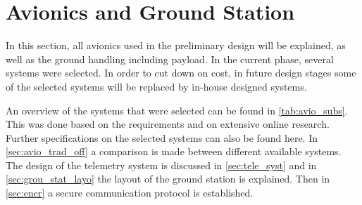 \section{Avionics and Ground Station}%
\label{sec:avio_grou_stat}
In this section, all avionics used in the preliminary design will be explained, as well as the ground handling including payload. In the current phase, several systems were selected. In order to cut down on cost, in future design stages some of the selected systems will be replaced by in-house designed systems. 

An overview of the systems that were selected can be found in \autoref{tab:avio_subs}. This was done based on the requirements %
and on extensive online research. Further specifications on the selected systems can also be found here. In \autoref{sec:avio_trad_off} a comparison is made between different available systems. The design of the telemetry system is discussed in \autoref{sec:tele_syst} and in \autoref{sec:grou_stat_layo} the layout of the ground station is explained. Then in \autoref{sec:encr} a secure communication protocol is established. 





